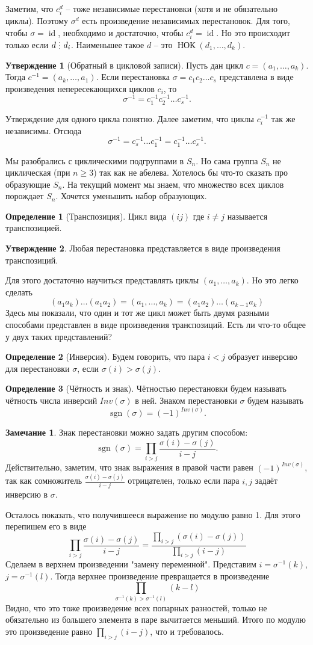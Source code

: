 \documentclass[10pt,a4paper,oneside]{book}
\theoremstyle{definition}
\newtheorem*{rem}{\color{green!50!blue}Замечание}
\newtheorem*{defn}{\color{yellow!30!red} Определение}
\newtheorem{utvr}{\color{blue!50!black}Утверждение}
\renewcommand{\geq}{\geqslant}
\newcommand{\id}{\operatorname{id}}
\newcommand{\di}{\mathop{\,\scalebox{0.85}{\raisebox{-1.2pt}[0.5\height]{\vdots}}\,}}
\newcommand{\Nok}{\operatorname{\text{НОК}}}
\newcommand{\sgn}{\operatorname{sgn}}
\def\dfn{\begin{defn}}
\def\edfn{\end{defn}}
\def\rm{\begin{rem}}
\def\erm{\end{rem}}
\def\utv{\begin{utvr}}
\def\eutv{\end{utvr}}
\begin{document}
Заметим, что $c_i^d$ -- тоже независимые перестановки (хотя и не обязательно циклы). Поэтому $\sigma^d$  есть произведение независимых перестановок. Для того, чтобы $\sigma =\id$, необходимо и достаточно, чтобы $c_i^d=\id$. Но это происходит только если $d\di d_i$. Наименьшее такое $d$ -- это $\Nok(d_1,\dots,d_k)$.
\endproof

\utv[Обратный в цикловой записи] Пусть дан цикл $c=(a_1,\dots,a_k)$. Тогда $c^{-1}=(a_k,\dots,a_1)$. Если перестановка   $\sigma= c_1c_2\dots c_s$ представлена в виде произведения непересекающихся циклов $c_i$, то
$$\sigma^{-1}=c_1^{-1}c_2^{-1}\dots c_s^{-1}.$$
\eutv
\proof Утверждение для одного цикла понятно. Далее заметим, что циклы $c_i^{-1}$ так же независимы. Отсюда
$$\sigma^{-1}=c_s^{-1}\dots c_1^{-1}=c_1^{-1}\dots c_s^{-1}.$$
\endproof



Мы разобрались с циклическими подгруппами в $S_n$. Но сама группа $S_n$ не циклическая (при $n\geq 3$) так как не абелева. Хотелось бы что-то сказать про образующие $S_n$. На текущий момент мы знаем, что множество всех циклов порождает $S_n$. Хочется уменьшить набор образующих.

\dfn[Транспозиция] Цикл вида $(ij)$ где $i\neq j$ называется транспозицией.
\edfn

\utv Любая перестановка представляется в виде произведения транспозиций.
\eutv
\proof Для этого достаточно научиться представлять циклы $(a_1,\dots,a_k)$. Но это легко сделать
$$(a_1 a_k)\dots( a_1 a_2)=(a_1,\dots,a_k)=(a_1a_2)\dots (a_{k-1} a_k)$$
\endproof
Здесь мы показали, что один и тот же цикл может быть двумя разными способами представлен в виде произведения транспозиций. Есть ли что-то общее у двух таких представлений?

\dfn[Инверсия] Будем говорить, что пара $i<j$  образует инверсию для перестановки $\sigma$, если $\sigma(i)>\sigma(j)$.
\edfn

\dfn[Чётность и знак] Чётностью перестановки будем называть чётность числа инверсий $Inv(\sigma)$ в ней. Знаком перестановки $\sigma$ будем называть 
$$\sgn(\sigma)=(-1)^{Inv(\sigma)}.$$
\edfn

\rm Знак перестановки можно задать другим способом: 
$$\sgn(\sigma)= \prod_{i>j} \frac{\sigma(i)-\sigma(j)}{i-j}.$$
Действительно, заметим, что знак выражения в правой части равен $(-1)^{Inv (\sigma)}$, так как сомножитель $\frac{\sigma(i)-\sigma(j)}{i-j}$ отрицателен, только если пара $i,j$ задаёт инверсию в $\sigma$.

Осталось показать, что получившееся выражение по модулю равно 1. Для этого перепишем его в виде 
$$\prod_{i>j} \frac{\sigma(i)-\sigma(j)}{i-j}= \frac{\prod_{i>j} (\sigma(i)-\sigma(j))}{\prod_{i>j}(i-j)}
$$
Сделаем в верхнем произведении "замену переменной". Представим $i=\sigma^{-1}(k)$, $j=\sigma^{-1}(l)$. Тогда верхнее произведение превращается в произведение 
$$\prod_{\sigma^{-1}(k)>\sigma^{-1}(l)} (k-l)$$
Видно, что это тоже произведение всех попарных разностей, только не обязательно из большего элемента в паре вычитается меньший. Итого по модулю это произведение равно $\prod_{i>j}(i-j)$, что  и требовалось.
\erm
\end{document}
